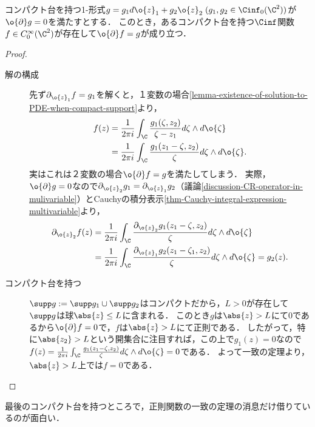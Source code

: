 \documentclass[uplatex, dvipdfmx]{jsreport}
\begin{document}
\begin{theorem}[十分性]\label{thm-CR-operator-in-multivariable-is-epic}
    コンパクト台を持つ1-形式$g=g_1d\o{z}_1+g_2\o{z}_2\;(g_1,g_2\in\Cinf_0(\C^2))$が$\o{\partial}g=0$を満たすとする．
    このとき，あるコンパクト台を持つ$\Cinf$関数$f\in C_0^\infty(\C^2)$が存在して$\o{\partial}f=g$が成り立つ．
\end{theorem}
\begin{proof}\mbox{}
    \begin{description}
        \item[解の構成] 先ず$\partial_{\o{z}_1}f=g_1$を解くと，１変数の場合\ref{lemma-existence-of-solution-to-PDE-when-compact-support}より，
        \begin{align*}
            f(z)&=\frac{1}{2\pi i}\int_\C\frac{g_1(\zeta,z_2)}{\zeta-z_1}d\zeta\wedge d\o{\zeta}\\
            &=\frac{1}{2\pi i}\int_\C\frac{g_1(z_1-\zeta,z_2)}{\zeta}d\zeta\wedge d\o{\zeta}.
        \end{align*}
        実はこれは２変数の場合$\o{\partial}f=g$を満たしてしまう．
        実際，$\o{\partial}g=0$なので$\partial_{\o{z}_2}g_1=\partial_{\o{z}_1}g_2$（議論\ref{discussion-CR-operator-in-mulivariable}）とCauchyの積分表示\ref{thm-Cauchy-integral-expression-multivariable}より，
        \begin{align*}
            \partial_{\o{z}_2}f(z)&=\frac{1}{2\pi i}\int_\C\frac{\partial_{\o{z}_2}g_1(z_1-\zeta,z_2)}{\zeta}d\zeta\wedge d\o{\zeta}\\
            &=\frac{1}{2\pi i}\int_\C\frac{\partial_{\o{z}_1}g_2(z_1-\zeta_1,z_2)}{\zeta}d\zeta\wedge d\o{\zeta}=g_2(z).
        \end{align*}
        \item[コンパクト台を持つ]
        $\supp g:=\supp g_1\cup\supp g_2$はコンパクトだから，$L>0$が存在して$\supp g$は球$\abs{z}\le L$に含まれる．
        このとき$g$は$\abs{z}>L$にて$0$であるから$\o{\partial}f=0$で，$f$は$\abs{z}>L$にて正則である．
        したがって，特に$\abs{z_2}>L$という開集合に注目すれば，この上で$g_1(z)=0$なので$f(z)=\frac{1}{2\pi i}\int_\C\frac{g_1(z_1-\zeta,z_2)}{\zeta}d\zeta\wedge d\o{\zeta}=0$である．
        よって一致の定理より，$\abs{z}>L$上では$f=0$である．
    \end{description}
\end{proof}
\begin{remarks}
    最後のコンパクト台を持つところで，正則関数の一致の定理の消息だけ借りているのが面白い．
\end{remarks}
\end{document}
